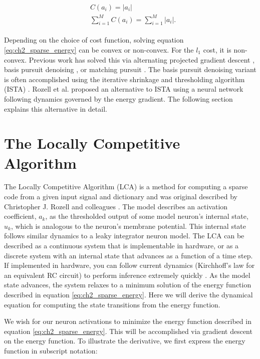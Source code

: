 \begin{align}\label{eq:ch2_l1_cost}
\begin{split}
  &C(a_{i}) = |a_{i}| \\
  &\sum\limits_{i=1}^{M}C(a_{i}) = \sum\limits_{i=1}^{M}|a_{i}|.
\end{split}
\end{align}

Depending on the choice of cost function, solving equation \eqref{eq:ch2_sparse_energy} can be convex or non-convex. For the $l_{1}$ cost, it is non-convex. Previous work has solved this via alternating projected gradient descent \parencite{olshausen1997sparse}, basis pursuit denoising \parencite{chen2001atomic}, or matching pursuit \parencite{davis1997adaptive, rehn2007network, rebollo2002optimized}. The basis pursuit denoising variant is often accomplished using the iterative shrinkage and thresholding algorithm (ISTA) \parencite{daubechies2004iterative, beck2009fast}. Rozell et al. \citeyearpar{rozell2008sparse} proposed an alternative to ISTA using a neural network following dynamics governed by the energy gradient. The following section explains this alternative in detail.


\section{The Locally Competitive Algorithm}\label{sec:ch2_lca}
The Locally Competitive Algorithm (LCA) is a method for computing a sparse code from a given input signal and dictionary and was original described by Christopher J. Rozell and colleagues \citeyearpar{rozell2008sparse}. The model describes an activation coefficient, $a_{k}$, as the thresholded output of some model neuron's internal state, $u_{k}$, which is analogous to the neuron's membrane potential. This internal state follows similar dynamics to a leaky integrator neuron model. The LCA can be described as a continuous system that is implementable in hardware, or as a discrete system with an internal state that advances as a function of a time step. If implemented in hardware, you can follow current dynamics (Kirchhoff's law for an equivalent RC circuit) to perform inference extremely quickly \parencite{rozell2008sparse}. As the model state advances, the system relaxes to a minimum solution of the energy function described in equation \eqref{eq:ch2_sparse_energy}. Here we will derive the dynamical equation for computing the state transitions from the energy function.

We wish for our neuron activations to minimize the energy function described in equation \eqref{eq:ch2_sparse_energy}. This will be accomplished via gradient descent on the energy function. To illustrate the derivative, we first express the energy function in subscript notation:

